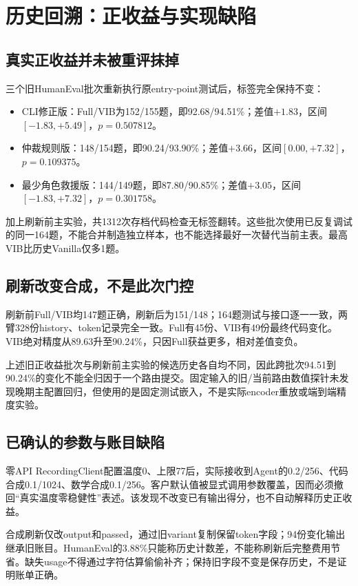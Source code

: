 \documentclass[11pt,a4paper]{article}
\begin{document}


\section{历史回溯：正收益与实现缺陷}
\subsection{真实正收益并未被重评抹掉}
三个旧HumanEval批次重新执行原entry-point测试后，标签完全保持不变：
\begin{itemize}
\item CLI修正版：Full/VIB为152/155题，即92.68/94.51\%；差值$+1.83$，区间$[-1.83,+5.49]$，$p=0.507812$。
\item 仲裁规则版：148/154题，即90.24/93.90\%；差值$+3.66$，区间$[0.00,+7.32]$，$p=0.109375$。
\item 最少角色救援版：144/149题，即87.80/90.85\%；差值$+3.05$，区间$[-1.83,+7.32]$，$p=0.301758$。
\end{itemize}
加上刷新前主实验，共1312次存档代码检查无标签翻转。这些批次使用已反复调试的同一164题，不能合并制造独立样本，也不能选择最好一次替代当前主表。最高VIB比历史Vanilla仅多1题。

\subsection{刷新改变合成，不是此次门控}
刷新前Full/VIB均147题正确，刷新后为151/148；164题测试与接口逐一一致，两臂328份history、token记录完全一致。Full有45份、VIB有49份最终代码变化。VIB绝对精度从89.63升至90.24\%，只因Full获益更多，相对差值变负。

上述旧正收益批次与刷新前主实验的候选历史各自均不同，因此跨批次94.51到90.24\%的变化不能全归因于一个路由提交。固定输入的旧/当前路由数值探针未发现晚期主配置回归，但使用的是固定测试嵌入，不是实际encoder重放或端到端精度实验。

\subsection{已确认的参数与账目缺陷}
零API RecordingClient配置温度0、上限77后，实际接收到Agent的0.2/256、代码合成0.1/1024、数学合成0.1/256。客户默认值被显式调用参数覆盖，因而必须撤回“真实温度零稳健性”表述。该发现不改变已有输出得分，也不自动解释历史正收益。

合成刷新仅改output和passed，通过旧variant复制保留token字段；94份变化输出继承旧账目。HumanEval的3.88\%只能称历史计数差，不能称刷新后完整费用节省。缺失usage不得通过字符估算偷偷补齐；保持旧字段不变是保存历史，不是证明账单正确。
\end{document}
